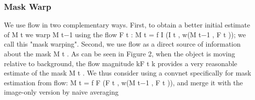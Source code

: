 \subsubsection{Mask Warp}
We use ﬂow in two complementary ways. First, to obtain a better initial estimate of M t we warp M t−1 using the ﬂow F t : M t = f I (I t , w(M t−1 , F t )); we call this "mask warping". Second, we use ﬂow as a direct source of information about the mask M t . As can be seen in Figure 2, when the object is moving relative to background, the ﬂow magnitude kF t k provides a very reasonable estimate of the mask M t . We thus consider using a convnet speciﬁcally for mask estimation from ﬂow: M t = f F (F t , w(M t−1 , F t )), and merge it with the image-only version by naive averaging